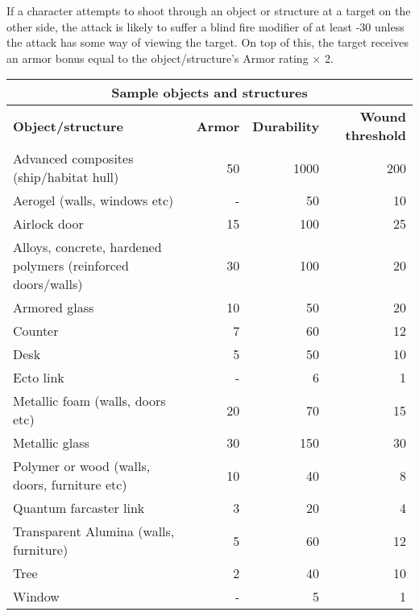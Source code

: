 If a character attempts to shoot through an object or structure at a target on the other side, the attack is likely to suffer a blind fire modifier of at least -30 unless the attack has some way of viewing the target. On top of this, the target receives an armor bonus equal to the object/structure’s Armor rating $\times$ 2. 

\begin{table} \begin{tabularx}{\textwidth}{|X|r|r|r|} \hline

\multicolumn{4}{|c|}{\textbf{Sample objects and structures}} \\ \hline

\textbf{Object/structure} &\textbf{Armor} &\textbf{Durability} &\textbf{Wound threshold}	\\ \hline

Advanced composites (ship/habitat hull)	&50	&1000	&200	\\ \hline

Aerogel (walls, windows etc)	&-	&50	&10	\\ \hline

Airlock door	&15	&100	&25	\\ \hline

Alloys, concrete, hardened polymers (reinforced doors/walls)	&30	&100	&20	\\ \hline

Armored glass	&10	&50	&20	\\ \hline

Counter	&7	&60	&12	\\ \hline

Desk	&5	&50	&10	\\ \hline

Ecto link	&-	&6	&1	\\ \hline

Metallic foam (walls, doors etc)	&20	&70	&15	\\ \hline

Metallic glass	&30	&150	&30	\\ \hline

Polymer or wood (walls, doors, furniture etc)	&10	&40	&8	\\ \hline

Quantum farcaster link	&3	&20	&4	\\ \hline

Transparent Alumina (walls, furniture)	&5	&60	&12	\\ \hline

Tree	&2	&40	&10	\\ \hline

Window	&-	&5	&1	\\ \hline

\end{tabularx} \label{tab:sample-objects-structures} \end{table} 

